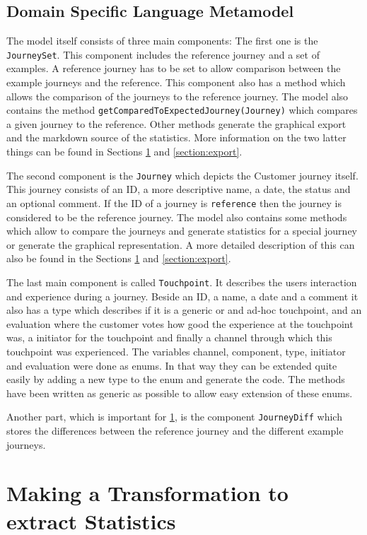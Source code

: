 \documentclass[12pt]{scrartcl}
\begin{document}
\subsection{Domain Specific Language Metamodel}
The model itself consists of three main components: The first one is the \lstinline!JourneySet!. This component
includes the reference journey and a set of examples. A reference journey has to be set to allow comparison
between the example journeys and the reference. This component also has a method which allows the comparison
of the journeys to the reference journey. The model also contains the method \lstinline!getComparedToExpectedJourney(Journey)!
which compares a given journey to the reference. Other methods generate the graphical export and the markdown source of the
statistics. More information on the two latter things can be found in Sections \ref{section:statistic} and \ref{section:export}.

The second component is the \lstinline!Journey! which depicts the Customer journey itself. This journey consists of 
an ID, a more descriptive name, a date, the status and an optional comment. If the ID of a journey is 
\lstinline!reference! then the journey is considered to be the reference journey. The model also contains some 
methods which allow to compare the journeys and generate statistics for a special journey or generate the graphical
representation. A more detailed description of this can also be found in the Sections \ref{section:statistic} and
\ref{section:export}.

The last main component is called \lstinline!Touchpoint!. It describes the users interaction and experience during
a journey. Beside an ID, a name, a date and a comment it also has a type which describes if it is a generic or
and ad-hoc touchpoint, and an evaluation where the customer votes how good the experience at the touchpoint was, a 
initiator for the touchpoint and finally a channel through which this touchpoint was experienced. The variables
channel, component, type, initiator and evaluation were done as enums. In that way they can be extended quite
easily by adding a new type to the enum and generate the code. The methods have been written as generic as possible
to allow easy extension of these enums.

Another part, which is important for \ref{section:statistic}, is the component \lstinline!JourneyDiff! which stores
the differences between the reference journey and the different example journeys.

\section{Making a Transformation to extract Statistics} 
\label{section:statistic}
\end{document}
